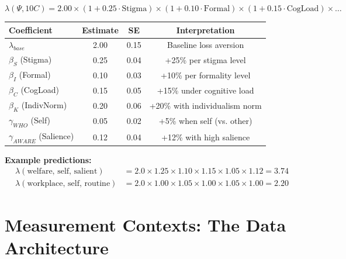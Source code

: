 \begin{tcolorbox}[colback=yellow!5!white, colframe=yellow!75!black, title=Hypothetical Estimate: $F_\lambda$]
\begin{equation}
\lambda(\Psi, 10C) = 2.00 \times (1 + 0.25 \cdot \text{Stigma}) \times (1 + 0.10 \cdot \text{Formal}) \times (1 + 0.15 \cdot \text{CogLoad}) \times \ldots
\end{equation}

\begin{center}
\begin{tabular}{lccc}
\toprule
\textbf{Coefficient} & \textbf{Estimate} & \textbf{SE} & \textbf{Interpretation} \\
\midrule
$\lambda_{base}$ & 2.00 & 0.15 & Baseline loss aversion \\
$\beta_S$ (Stigma) & 0.25 & 0.04 & +25\% per stigma level \\
$\beta_I$ (Formal) & 0.10 & 0.03 & +10\% per formality level \\
$\beta_C$ (CogLoad) & 0.15 & 0.05 & +15\% under cognitive load \\
$\beta_K$ (IndivNorm) & 0.20 & 0.06 & +20\% with individualism norm \\
$\gamma_{WHO}$ (Self) & 0.05 & 0.02 & +5\% when self (vs. other) \\
$\gamma_{AWARE}$ (Salience) & 0.12 & 0.04 & +12\% with high salience \\
\bottomrule
\end{tabular}
\end{center}

\textbf{Example predictions:}
\begin{align*}
\lambda(\text{welfare, self, salient}) &= 2.0 \times 1.25 \times 1.10 \times 1.15 \times 1.05 \times 1.12 = 3.74 \\
\lambda(\text{workplace, self, routine}) &= 2.0 \times 1.00 \times 1.05 \times 1.00 \times 1.05 \times 1.00 = 2.20
\end{align*}
\end{tcolorbox}



\section{Measurement Contexts: The Data Architecture}
\label{sec:measurement-contexts}

